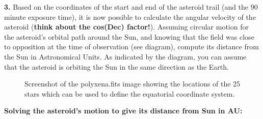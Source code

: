 {\bf 3.} Based on the coordinates of the start and end of the asteroid trail (and the 90 minute 
exposure time), it is now possible to calculate the angular velocity of the asteroid
({\bf think about the cos(Dec) factor!}). Assuming
circular motion for the asteroid's orbital path around the Sun, and
knowing that the field was close to opposition at the time of
observation (see diagram), compute its distance from the Sun in Astronomical Units. 
As indicated by the diagram, you can assume that
the asteroid is orbiting the Sun in the same direction as the Earth.
\begin{figure}
\centerline{}
\caption{Screenshot of the polyxena.fits image showing the locations of the 25 stars which can be used to define the equatorial coordinate system.}
\end{figure}

\newpage
\vspace*{1cm}

{\bf Solving the asteroid's motion to give its distance from Sun in AU:} \\

